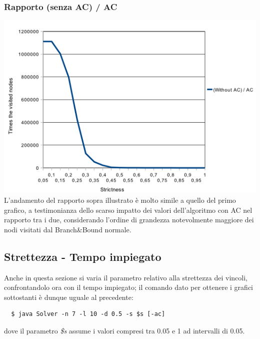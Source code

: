 \documentclass[a4paper,12pt,italian]{article}
\begin{document}
\subsubsection{Rapporto (senza AC) / AC}
\includegraphics[scale=0.8]{strictNodesQuotient.png}
\\
L'andamento del rapporto sopra illustrato \`e molto simile a quello del primo grafico, a testimonianza
dello scarso impatto dei valori dell'algoritmo con AC nel rapporto tra i due, considerando l'ordine di grandezza
notevolmente maggiore dei nodi visitati dal Branch\&Bound normale.

\subsection{Strettezza - Tempo impiegato}
Anche in questa sezione si varia il parametro relativo alla strettezza dei vincoli, confrontandolo
ora con il tempo impiegato; il comando dato per ottenere i grafici sottostanti
\`e dunque uguale al precedente:
\begin{verbatim}
  $ java Solver -n 7 -l 10 -d 0.5 -s $s [-ac]
\end{verbatim}
dove il parametro \textit{\$s} assume i valori compresi tra 0.05 e 1 ad intervalli di 0.05.
\end{document}
